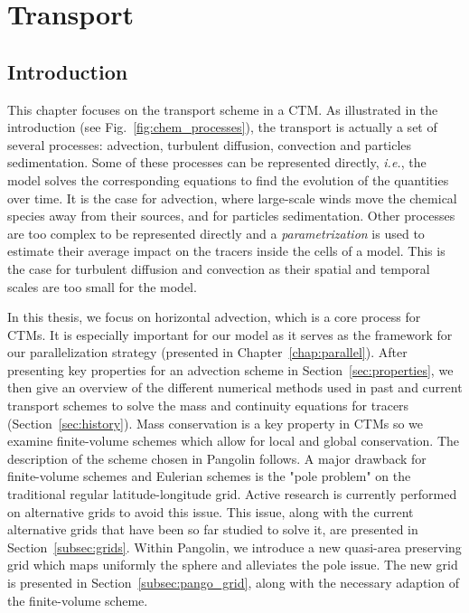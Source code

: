 \chapter{Transport}
\label{chap:transport}

\section{Introduction}
This chapter focuses on the transport scheme in a CTM. As illustrated in the
introduction (see Fig.~\ref{fig:chem_processes}), the transport is actually a
set of several processes: advection, turbulent diffusion, convection and
particles sedimentation. Some of these processes can be represented directly,
\textit{i.e.}, the model solves the corresponding equations to find the
evolution of the quantities over time. It is the case for advection, where
large-scale winds move the chemical species away from their sources, and for
particles sedimentation. Other processes are too complex to be represented
directly and a \textit{parametrization} is used to estimate their average impact
on the tracers inside the cells of a model. This is the case for turbulent
diffusion and convection as their spatial and temporal scales are too small for
the model.

\renewcommand{\thefigure}{\arabic{chapter}.\arabic{figure}}

In this thesis, we focus on horizontal advection, which is a core process for
CTMs. It is especially important for our model as it serves as the framework for our
parallelization strategy (presented in Chapter~\ref{chap:parallel}). After
presenting key properties for an advection scheme in
Section~\ref{sec:properties}, we then give an overview of the different
numerical methods used in past and current transport schemes to solve the mass
and continuity equations for tracers (Section~\ref{sec:history}).  Mass
conservation is a key property in CTMs so we examine finite-volume schemes which
allow for local and global conservation. The description of the scheme chosen in
Pangolin follows.  A major drawback for finite-volume schemes and Eulerian
schemes is the "pole problem" on the traditional regular latitude-longitude
grid. Active research is currently performed on alternative grids to avoid this
issue. This issue, along with the current alternative grids that have been so
far studied to solve it, are presented in Section~\ref{subsec:grids}. Within
Pangolin, we introduce a new quasi-area preserving grid which maps uniformly the
sphere and alleviates the pole issue. The new grid is presented in
Section~\ref{subsec:pango_grid}, along with the necessary adaption of the
finite-volume scheme.

